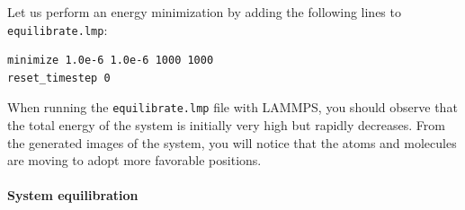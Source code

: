 \documentclass[9pt,tutorial]{livecoms}
\newcommand{\lmpcmd}[1]{\hspace{0pt}\colorbox{listing}{\textcolor{command}{\small{#1}}}\hspace{0pt}} %
\newcommand{\flecmd}[1]{\textcolor{command}{\texttt{#1}}} %
\begin{document}
Let us perform an energy minimization by adding the following lines to \flecmd{equilibrate.lmp}:
\begin{lstlisting}
minimize 1.0e-6 1.0e-6 1000 1000
reset_timestep 0
\end{lstlisting}
When running the \flecmd{equilibrate.lmp} file with LAMMPS, you should observe that the
total energy of the system is initially very high but rapidly decreases.  From the generated
images of the system, you will notice that the atoms and molecules are moving to adopt more favorable positions.








\paragraph{System equilibration}
\end{document}

